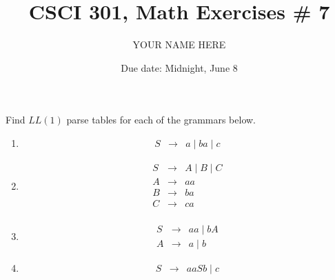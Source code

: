 \documentclass{article}
\title{CSCI 301, Math Exercises \# 7}
\author{YOUR NAME HERE}
\date{Due date:  Midnight, June 8}
\begin{document}
\maketitle


\noindent Find $LL(1)$ parse tables for each of the grammars 
below.
\begin{enumerate}
  
\item \label{llfirst}
  \begin{eqnarray*}
    S &\rightarrow& a \mid ba \mid c
  \end{eqnarray*}
\item
  \begin{eqnarray*}
    S &\rightarrow& A \mid B \mid C\\
    A &\rightarrow& aa\\
    B &\rightarrow& ba\\
    C &\rightarrow& ca\\
  \end{eqnarray*}
  
\item
  \begin{eqnarray*}
    S &\rightarrow& aa \mid bA\\
    A &\rightarrow& a \mid b
    \end{eqnarray*}

\item \label{lllast}
  \begin{eqnarray*}
    S &\rightarrow& aaSb \mid c
    \end{eqnarray*}


\end{enumerate}
\end{document}
